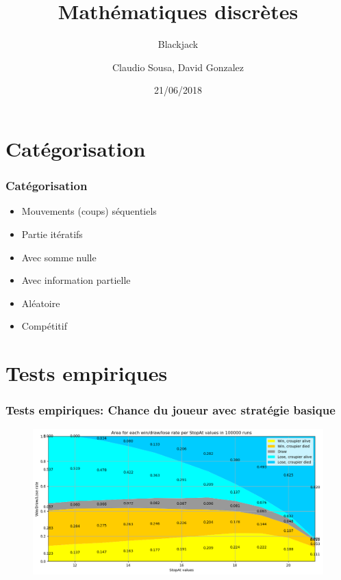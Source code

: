 \documentclass{beamer}
\title[]{Mathématiques discrètes}
\subtitle{Blackjack}
\author{Claudio Sousa, David Gonzalez}
\institute{HEPIA}
\date{21/06/2018}
\begin{document}
\begin{frame}[plain]
    \titlepage
\end{frame}

\section{Catégorisation}

\begin{frame}
    \frametitle{Catégorisation}
    \begin{itemize}
        \item Mouvements (coups) séquentiels
        \item Partie itératifs
        \item Avec somme nulle
        \item Avec information partielle
        \item Aléatoire
        \item Compétitif
    \end{itemize}
\end{frame}

\section{Tests empiriques}

\begin{frame}
    \frametitle{Tests empiriques: Chance du joueur avec stratégie basique}
    \begin{figure}[H]
        \begin{center}
            \includegraphics[width=1\textwidth]{empirical_graph1}
        \end{center}
    \end{figure}
\end{frame}
\end{document}

